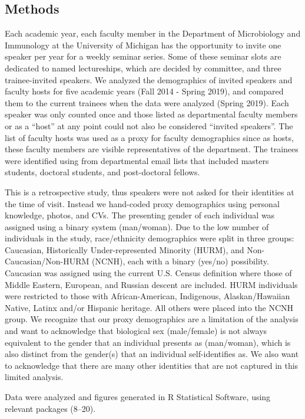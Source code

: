 \documentclass[10pt,]{article}
\begin{document}
\subsection{Methods}\label{methods}

Each academic year, each faculty member in the Department of
Microbiology and Immunology at the University of Michigan has the
opportunity to invite one speaker per year for a weekly seminar series.
Some of these seminar slots are dedicated to named lectureships, which
are decided by committee, and three trainee-invited speakers. We
analyzed the demographics of invited speakers and faculty hosts for five
academic years (Fall 2014 - Spring 2019), and compared them to the
current trainees when the data were analyzed (Spring 2019). Each speaker
was only counted once and those listed as departmental faculty members
or as a ``host'' at any point could not also be considered ``invited
speakers''. The list of faculty hosts was used as a proxy for faculty
demographics since as hosts, these faculty members are visible
representatives of the department. The trainees were identified using
from departmental email lists that included masters students, doctoral
students, and post-doctoral fellows.

This is a retrospective study, thus speakers were not asked for their
identities at the time of visit. Instead we hand-coded proxy
demographics using personal knowledge, photos, and CVs. The presenting
gender of each individual was assigned using a binary system
(man/woman). Due to the low number of individuals in the study,
race/ethnicity demographics were split in three groups: Caucasian,
Historically Under-represented Minority (HURM), and
Non-Caucasian/Non-HURM (NCNH), each with a binary (yes/no) possibility.
Caucasian was assigned using the current U.S. Census definition where
those of Middle Eastern, European, and Russian descent are included.
HURM individuals were restricted to those with African-American,
Indigenous, Alaskan/Hawaiian Native, Latinx and/or Hispanic heritage.
All others were placed into the NCNH group. We recognize that our proxy
demographics are a limitation of the analysis and want to acknowledge
that biological sex (male/female) is not always equivalent to the gender
that an individual presents as (man/woman), which is also distinct from
the gender(s) that an individual self-identifies as. We also want to
acknowledge that there are many other identities that are not captured
in this limited analysis.

Data were analyzed and figures generated in R Statistical Software,
using relevant packages (8--20).
\end{document}
